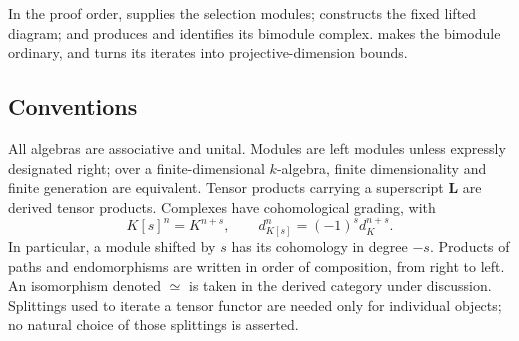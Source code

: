 In the proof order,  supplies the selection modules;
 constructs the fixed lifted diagram; and
 produces and identifies its bimodule complex.
 makes the bimodule ordinary, and
 turns its iterates into projective-dimension bounds.

\subsection{Conventions}

All algebras are associative and unital.  Modules are left modules
unless expressly designated right; over a finite-dimensional
\(k\)-algebra, finite dimensionality and finite generation are
equivalent.  Tensor products carrying a superscript \(\mathbf L\)
are derived tensor products.  Complexes have cohomological grading,
with
\[
K[s]^n=K^{n+s},
\qquad d_{K[s]}^n=(-1)^s d_K^{n+s}.
\]
In particular, a module shifted by \(s\) has its cohomology in
degree \(-s\).  Products of paths and endomorphisms are written
in order of composition, from right to left.
An isomorphism denoted \(\simeq\) is taken in the derived category
under discussion.  Splittings used to iterate a tensor functor
are needed only for individual objects; no natural choice of
those splittings is asserted.
